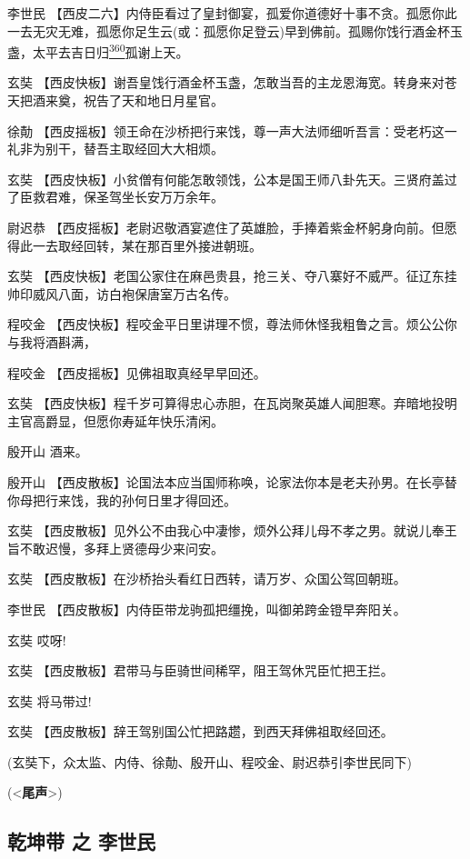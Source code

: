 李世民
【西皮二六】内侍臣看过了皇封御宴，孤爱你道德好十事不贪。孤愿你此一去无灾无难，孤愿你足生云(或：孤愿你足登云)早到佛前。孤赐你饯行酒金杯玉盏，太平去吉日归\protect\hyperlink{fn360}{\textsuperscript{360}}孤谢上天。

玄奘
【西皮快板】谢吾皇饯行酒金杯玉盏，怎敢当吾的主龙恩海宽。转身来对苍天把酒来奠，祝告了天和地日月星官。

徐勣
【西皮摇板】领王命在沙桥把行来饯，尊一声大法师细听吾言：受老朽这一礼非为别干，替吾主取经回大大相烦。

玄奘
【西皮快板】小贫僧有何能怎敢领饯，公本是国王师八卦先天。三贤府盖过了臣救君难，保圣驾坐长安万万余年。

尉迟恭
【西皮摇板】老尉迟敬酒宴遮住了英雄脸，手捧着紫金杯躬身向前。但愿得此一去取经回转，某在那百里外接进朝班。

玄奘
【西皮快板】老国公家住在麻邑贵县，抢三关、夺八寨好不威严。征辽东挂帅印威风八面，访白袍保唐室万古名传。

程咬金
【西皮快板】程咬金平日里讲理不惯，尊法师休怪我粗鲁之言。烦公公你与我将酒斟满，

程咬金 【西皮摇板】见佛祖取真经早早回还。

玄奘
【西皮快板】程千岁可算得忠心赤胆，在瓦岗聚英雄人闻胆寒。弃暗地投明主官高爵显，但愿你寿延年快乐清闲。

殷开山 酒来。

殷开山
【西皮散板】论国法本应当国师称唤，论家法你本是老夫孙男。在长亭替你母把行来饯，我的孙何日里才得回还。

玄奘
【西皮散板】见外公不由我心中凄惨，烦外公拜儿母不孝之男。就说儿奉王旨不敢迟慢，多拜上贤德母少来问安。

玄奘 【西皮散板】在沙桥抬头看红日西转，请万岁、众国公驾回朝班。

李世民 【西皮散板】内侍臣带龙驹孤把缰挽，叫御弟跨金镫早奔阳关。

玄奘 哎呀!

玄奘 【西皮散板】君带马与臣骑世间稀罕，阻王驾休咒臣忙把王拦。

玄奘 将马带过!

玄奘 【西皮散板】辞王驾别国公忙把路趱，到西天拜佛祖取经回还。

(玄奘下，众太监、内侍、徐勣、殷开山、程咬金、尉迟恭引李世民同下)

(\textless{}\textbf{尾声}\textgreater{})

\newpage
\hypertarget{ux4e7eux5764ux5e26-ux4e4b-ux674eux4e16ux6c11}{%
\subsection{乾坤带 之
李世民}\label{ux4e7eux5764ux5e26-ux4e4b-ux674eux4e16ux6c11}}

